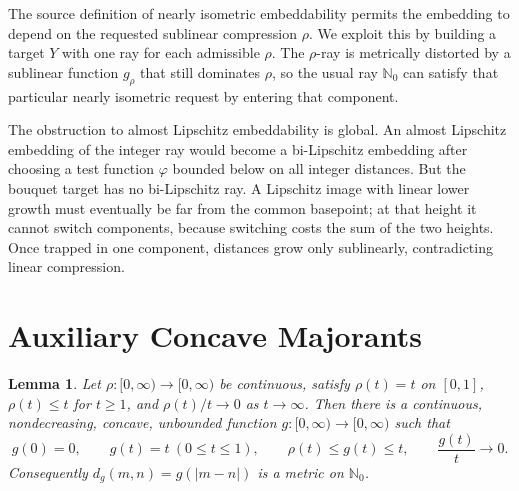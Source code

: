 \documentclass[11pt]{article}
\newtheorem{lemma}{Lemma}
\newcommand{\Nzero}{\mathbb N_0}
\begin{document}
The source definition of nearly isometric embeddability permits the embedding
to depend on the requested sublinear compression \(\rho\).  We exploit this by
building a target \(Y\) with one ray for each admissible \(\rho\).  The
\(\rho\)-ray is metrically distorted by a sublinear function \(g_\rho\) that
still dominates \(\rho\), so the usual ray \(\Nzero\) can satisfy that
particular nearly isometric request by entering that component.

The obstruction to almost Lipschitz embeddability is global.  An almost
Lipschitz embedding of the integer ray would become a bi-Lipschitz embedding
after choosing a test function \(\varphi\) bounded below on all integer
distances.  But the bouquet target has no bi-Lipschitz ray.  A Lipschitz image
with linear lower growth must eventually be far from the common basepoint; at
that height it cannot switch components, because switching costs the sum of
the two heights.  Once trapped in one component, distances grow only
sublinearly, contradicting linear compression.

\section*{Auxiliary Concave Majorants}

\begin{lemma}
\label{lem:majorant}
Let \(\rho:[0,\infty)\to[0,\infty)\) be continuous, satisfy
\(\rho(t)=t\) on \([0,1]\), \(\rho(t)\le t\) for \(t\ge1\), and
\(\rho(t)/t\to0\) as \(t\to\infty\).  Then there is a continuous,
nondecreasing, concave, unbounded function \(g:[0,\infty)\to[0,\infty)\)
such that
\[
g(0)=0,\qquad g(t)=t\ (0\le t\le1),\qquad
\rho(t)\le g(t)\le t,\qquad \frac{g(t)}{t}\to0.
\]
Consequently \(d_g(m,n)=g(|m-n|)\) is a metric on \(\Nzero\).
\end{lemma}
\end{document}
